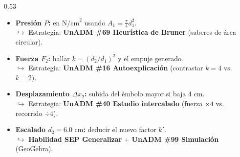 \documentclass[aspectratio=169,xcolor={dvipsnames,table}]{beamer}
\begin{document}
\begin{frame}[plain]
\begin{columns}[T,onlytextwidth]
\begin{column}{0.53\textwidth}
\begin{tcolorbox}[viscard=visBlue,title={4 INCÓGNITAS $\cdot$ ESTRATEGIA UnADM},top=4pt,bottom=4pt]
\begin{itemize}
          \item[\textcolor{visBlue}{\textbf{a)}}] \textbf{Presión $P$:} en $\text{N/cm}^2$ usando $A_1 = \frac{\pi}{4}d_1^2$.\\
                \textcolor{visTeal}{\tiny $\hookrightarrow$ Estrategia: \textbf{UnADM \#69 Heurística de Bruner} (saberes de área circular).}
          \item[\textcolor{visTeal}{\textbf{b)}}] \textbf{Fuerza $F_2$:} hallar $k = (d_2/d_1)^2$ y el empuje generado.\\
                \textcolor{visTeal}{\tiny $\hookrightarrow$ Estrategia: \textbf{UnADM \#16 Autoexplicación} (contrastar $k=4$ vs. $k=2$).}
          \item[\textcolor{visOrange}{\textbf{c)}}] \textbf{Desplazamiento $\Delta x_2$:} subida del émbolo mayor si baja $4\text{ cm}$.\\
                \textcolor{visOrange}{\tiny $\hookrightarrow$ Estrategia: \textbf{UnADM \#40 Estudio intercalado} (fuerza $\times 4$ vs. recorrido $\div 4$).}
          \item[\textcolor{visGreen}{\textbf{d)}}] \textbf{Escalado $d_2 = 6.0\text{ cm}$:} deducir el nuevo factor $k'$.\\
                \textcolor{visGreen}{\tiny $\hookrightarrow$ \textbf{Habilidad SEP Generalizar} + \textbf{UnADM \#99 Simulación} (GeoGebra).}
        \end{itemize}
      \end{tcolorbox}
    \end{column}
  \end{columns}
\end{frame}
\end{document}
